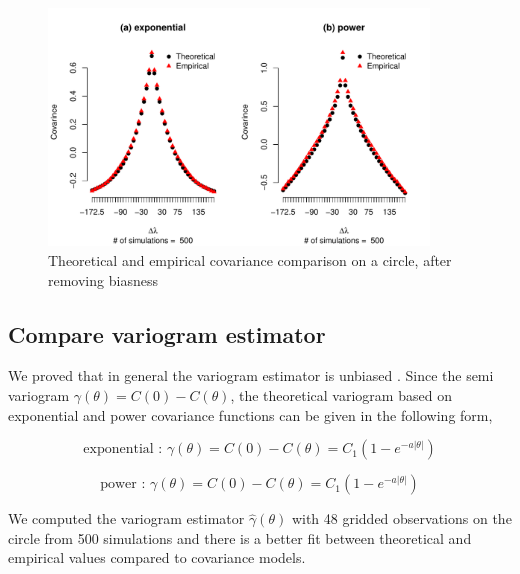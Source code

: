 	      \begin{figure}[H]
	      	\centering
	      	\includegraphics[width=0.9\textwidth]{graphs/covarince_circle_estimate_a0}
	      	\caption {Theoretical and empirical covariance comparison on a circle, after removing biasness}
	      \end{figure}
	      

	      	      
\subsection{Compare variogram estimator} 

We proved that in general the variogram estimator is unbiased . Since the semi variogram $\gamma(\theta) = C(0) - C(\theta)$,  the theoretical variogram based on exponential and power covariance functions can be given in the following form,   

\[
	\mbox{exponential : }\gamma(\theta) = C(0) - C(\theta) = C_1(1-e^{-a|\theta|})
\]

\[
	\mbox{power : } \gamma(\theta) = C(0) - C(\theta) = C_1(1-e^{-a|\theta|})
\]

We computed the variogram estimator $\hat{\gamma}(\theta)$ with 48 gridded observations on the circle from 500 simulations and there is a better fit between theoretical and empirical values compared to covariance models.


